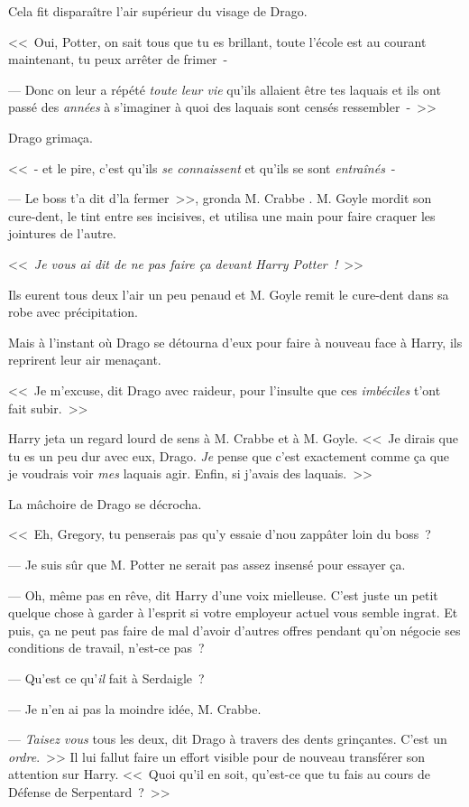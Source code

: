 Cela fit disparaître l'air supérieur du visage de Drago.

<<~Oui, Potter, on sait tous que tu es brillant, toute l'école est au courant maintenant, tu peux arrêter de frimer~-

--- Donc on leur a répété \emph{toute leur vie} qu'ils allaient être tes laquais et ils ont passé des \emph{années} à s'imaginer à quoi des laquais sont censés ressembler~-~>>

Drago grimaça.

<<~- et le pire, c'est qu'ils \emph{se connaissent} et qu'ils se sont \emph{entraînés}~-

--- Le boss t'a dit d'la fermer~>>, gronda M. Crabbe . M. Goyle mordit son cure-dent, le tint entre ses incisives, et utilisa une main pour faire craquer les jointures de l'autre.

<<~\emph{Je vous ai dit de ne pas faire ça devant Harry Potter~!}~>>

Ils eurent tous deux l'air un peu penaud et M. Goyle remit le cure-dent dans sa robe avec précipitation.

Mais à l'instant où Drago se détourna d'eux pour faire à nouveau face à Harry, ils reprirent leur air menaçant.

<<~Je m'excuse, dit Drago avec raideur, pour l'insulte que ces \emph{imbéciles} t'ont fait subir.~>>

Harry jeta un regard lourd de sens à M. Crabbe et à M. Goyle. <<~Je dirais que tu es un peu dur avec eux, Drago. \emph{Je} pense que c'est exactement comme ça que je voudrais voir \emph{mes} laquais agir. Enfin, si j'avais des laquais.~>>

La mâchoire de Drago se décrocha.

<<~Eh, Gregory, tu penserais pas qu'y essaie d'nou zappâter loin du boss~?

--- Je suis sûr que M. Potter ne serait pas assez insensé pour essayer ça.

--- Oh, même pas en rêve, dit Harry d'une voix mielleuse. C'est juste un petit quelque chose à garder à l'esprit si votre employeur actuel vous semble ingrat. Et puis, ça ne peut pas faire de mal d'avoir d'autres offres pendant qu'on négocie ses conditions de travail, n'est-ce pas~?

--- Qu'est ce qu'\emph{il} fait à Serdaigle~?

--- Je n'en ai pas la moindre idée, M. Crabbe.

--- \emph{Taisez vous} tous les deux, dit Drago à travers des dents grinçantes. C'est un \emph{ordre}.~>> Il lui fallut faire un effort visible pour de nouveau transférer son attention sur Harry. <<~Quoi qu'il en soit, qu'est-ce que tu fais au cours de Défense de Serpentard~?~>>

